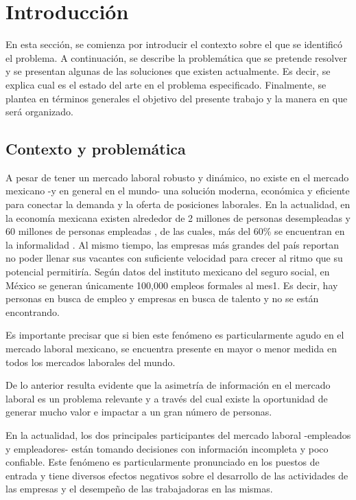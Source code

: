 \chapter{Introducción}

En esta sección, se comienza por introducir el contexto sobre el que se identificó el problema. A continuación, se describe la problemática que se pretende resolver y se presentan algunas de las soluciones que existen actualmente. Es decir, se explica cual es el estado del arte en el problema especificado. Finalmente, se plantea en términos generales el objetivo del presente trabajo y la manera en que será organizado.

\section{Contexto y problemática} 
A pesar de tener un mercado laboral robusto y dinámico, no existe en el mercado mexicano -y en general en el mundo- una solución moderna, económica y eficiente para conectar la demanda y la oferta de posiciones laborales. En la actualidad, en la economía mexicana existen alrededor de 2 millones de personas desempleadas \cite{derechohabiencia} y 60 millones de personas empleadas \cite{ocupacion}, de las cuales, más del 60\% se encuentran en la informalidad \cite{informalidad}. Al mismo tiempo, las empresas más grandes del país reportan no poder llenar sus vacantes con suficiente velocidad para crecer al ritmo que su potencial permitiría. Según datos del instituto mexicano del seguro social, en México se generan únicamente 100,000 empleos formales al mes1. Es decir, hay personas en busca de empleo y empresas en busca de talento y no se están encontrando. 

Es importante precisar que si bien este fenómeno es particularmente agudo en el mercado laboral mexicano, se encuentra presente en mayor o menor medida en todos los mercados laborales del mundo.

De lo anterior resulta evidente que la asimetría de información en el mercado laboral es un problema relevante y a través del cual existe la oportunidad de generar mucho valor e impactar a un gran número de personas.

En la actualidad, los dos principales participantes del mercado laboral -empleados y empleadores- están tomando decisiones con información incompleta y poco confiable. Este fenómeno es particularmente pronunciado en los puestos de entrada y tiene diversos efectos negativos sobre el desarrollo de las actividades de las empresas y el desempeño de las trabajadoras en las mismas.

